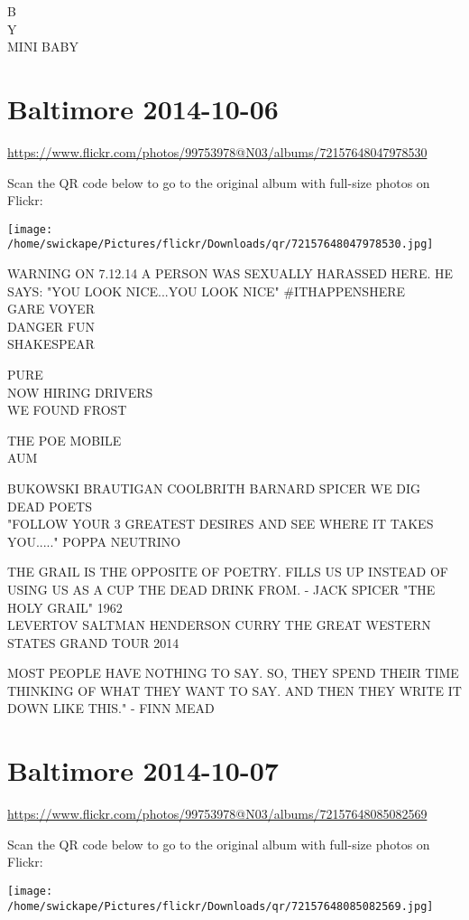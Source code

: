 \documentclass[10pt,letterpaper]{article}
\begin{document}
B\\
Y\\
MINI BABY
\pagebreak

\section*{Baltimore 2014-10-06}

\url{https://www.flickr.com/photos/99753978@N03/albums/72157648047978530}

Scan the QR code below to go to the original album with full-size photos on Flickr:

\texttt{[image: /home/swickape/Pictures/flickr/Downloads/qr/72157648047978530.jpg]}
\pagebreak

WARNING ON 7.12.14 A PERSON WAS SEXUALLY HARASSED HERE.  HE SAYS: "YOU LOOK NICE...YOU LOOK NICE" \#ITHAPPENSHERE\\
GARE VOYER\\
DANGER FUN\\
SHAKESPEAR

PURE\\
NOW HIRING DRIVERS\\
WE FOUND FROST

THE POE MOBILE\\
AUM

BUKOWSKI BRAUTIGAN COOLBRITH BARNARD SPICER WE DIG DEAD POETS\\
"FOLLOW YOUR 3 GREATEST DESIRES AND SEE WHERE IT TAKES YOU....." POPPA NEUTRINO

THE GRAIL IS THE OPPOSITE OF POETRY.  FILLS US UP INSTEAD OF USING US AS A CUP THE DEAD DRINK FROM.  {-} JACK SPICER "THE HOLY GRAIL" 1962\\
LEVERTOV SALTMAN HENDERSON CURRY THE GREAT WESTERN STATES GRAND TOUR 2014

MOST PEOPLE HAVE NOTHING TO SAY.  SO, THEY SPEND THEIR TIME THINKING OF WHAT THEY WANT TO SAY.  AND THEN THEY WRITE IT DOWN LIKE THIS." {-} FINN MEAD
\pagebreak

\section*{Baltimore 2014-10-07}

\url{https://www.flickr.com/photos/99753978@N03/albums/72157648085082569}

Scan the QR code below to go to the original album with full-size photos on Flickr:

\texttt{[image: /home/swickape/Pictures/flickr/Downloads/qr/72157648085082569.jpg]}
\pagebreak
\end{document}
